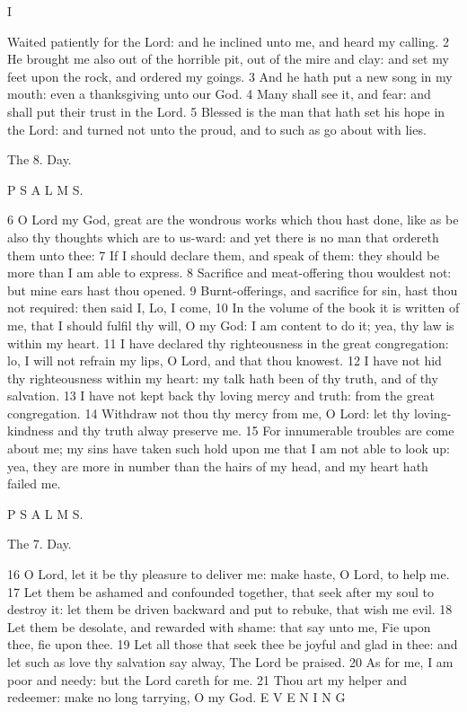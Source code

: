 I

Waited patiently for the Lord: and he inclined unto me, and heard my calling. 2 He brought me also out of the horrible pit, out of the mire and clay: and set my feet upon the rock, and ordered my goings. 3 And he hath put a new song in my mouth: even a thanksgiving unto our God. 4 Many shall see it, and fear: and shall put their trust in the Lord. 5 Blessed is the man that hath set his hope in the Lord: and turned not unto the proud, and to such as go about with lies.

The 8. Day.

P S A L M S.

6 O Lord my God, great are the wondrous works which thou hast done, like as be also thy thoughts which are to us-ward: and yet there is no man that ordereth them unto thee: 7 If I should declare them, and speak of them: they should be more than I am able to express. 8 Sacrifice and meat-offering thou wouldest not: but mine ears hast thou opened. 9 Burnt-offerings, and sacrifice for sin, hast thou not required: then said I, Lo, I come, 10 In the volume of the book it is written of me, that I should fulfil thy will, O my God: I am content to do it; yea, thy law is within my heart. 11 I have declared thy righteousness in the great congregation: lo, I will not refrain my lips, O Lord, and that thou knowest. 12 I have not hid thy righteousness within my heart: my talk hath been of thy truth, and of thy salvation. 13 I have not kept back thy loving mercy and truth: from the great congregation. 14 Withdraw not thou thy mercy from me, O Lord: let thy loving-kindness and thy truth alway preserve me. 15 For innumerable troubles are come about me; my sins have taken such hold upon me that I am not able to look up: yea, they are more in number than the hairs of my head, and my heart hath failed me.

P S A L M S.

The 7. Day.

16 O Lord, let it be thy pleasure to deliver me: make haste, O Lord, to help me. 17 Let them be ashamed and confounded together, that seek after my soul to destroy it: let them be driven backward and put to rebuke, that wish me evil. 18 Let them be desolate, and rewarded with shame: that say unto me, Fie upon thee, fie upon thee. 19 Let all those that seek thee be joyful and glad in thee: and let such as love thy salvation say alway, The Lord be praised. 20 As for me, I am poor and needy: but the Lord careth for me. 21 Thou art my helper and redeemer: make no long tarrying, O my God. E V E N I N G

